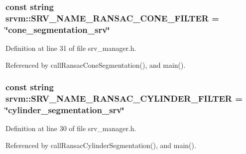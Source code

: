 \hypertarget{namespacesrvm_af2812968f812d475d50a80635965779d}{
\subsubsection[{S\-R\-V\-\_\-\-N\-A\-M\-E\-\_\-\-R\-A\-N\-S\-A\-C\-\_\-\-C\-O\-N\-E\-\_\-\-F\-I\-L\-T\-E\-R}]{\setlength{\rightskip}{0pt plus 5cm}const string srvm\-::\-S\-R\-V\-\_\-\-N\-A\-M\-E\-\_\-\-R\-A\-N\-S\-A\-C\-\_\-\-C\-O\-N\-E\-\_\-\-F\-I\-L\-T\-E\-R = \char`\"{}cone\-\_\-segmentation\-\_\-srv\char`\"{}}}\label{namespacesrvm_af2812968f812d475d50a80635965779d}


Definition at line 31 of file srv\-\_\-manager.\-h.



Referenced by call\-Ransac\-Cone\-Segmentation(), and main().

\hypertarget{namespacesrvm_ae5db0900b3766ce489c65d143ae595b6}{
\subsubsection[{S\-R\-V\-\_\-\-N\-A\-M\-E\-\_\-\-R\-A\-N\-S\-A\-C\-\_\-\-C\-Y\-L\-I\-N\-D\-E\-R\-\_\-\-F\-I\-L\-T\-E\-R}]{\setlength{\rightskip}{0pt plus 5cm}const string srvm\-::\-S\-R\-V\-\_\-\-N\-A\-M\-E\-\_\-\-R\-A\-N\-S\-A\-C\-\_\-\-C\-Y\-L\-I\-N\-D\-E\-R\-\_\-\-F\-I\-L\-T\-E\-R = \char`\"{}cylinder\-\_\-segmentation\-\_\-srv\char`\"{}}}\label{namespacesrvm_ae5db0900b3766ce489c65d143ae595b6}


Definition at line 30 of file srv\-\_\-manager.\-h.



Referenced by call\-Ransac\-Cylinder\-Segmentation(), and main().


